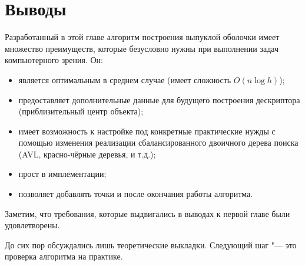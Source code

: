 \section{Выводы} \label{subsect2_5}

Разработанный в этой главе алгоритм построения выпуклой оболочки имеет множество преимуществ, которые безусловно нужны при выполнении задач компьютерного зрения. Он:
\begin{itemize}
	\item является оптимальным в среднем случае (имеет сложность $O(n \log h)$);
	\item предоставляет дополнительные данные для будущего построения дескриптора (приблизительный центр объекта);
	\item имеет возможность к настройке под конкретные практические нужды с помощью изменения реализации сбалансированного двоичного дерева поиска (AVL, красно-чёрные деревья, и т.д.);
	\item прост в имплементации;
	\item позволяет добавлять точки и после окончания работы алгоритма.
\end{itemize}

Заметим, что требования, которые выдвигались в выводах к первой главе были удовлетворены.

До сих пор обсуждались лишь теоретические выкладки. Следующий шаг "--- это проверка алгоритма на практике.
